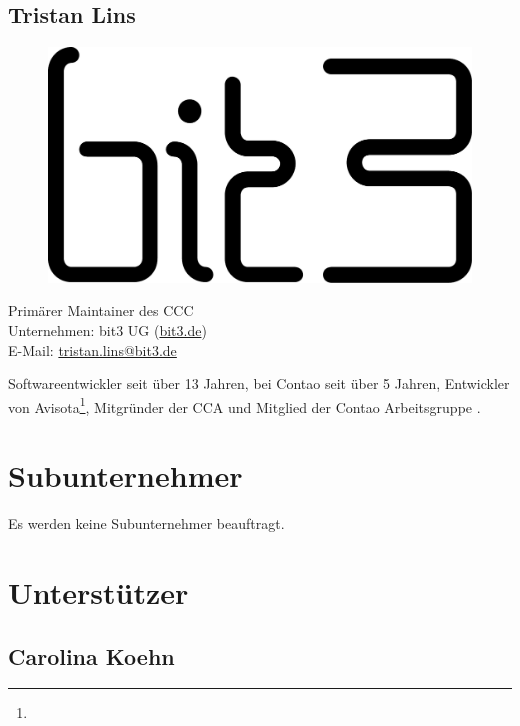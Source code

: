 \documentclass[
paper=a4,
draft=false,%
fontsize=10pt%
]{scrartcl}
\begin{document}
\subsection*{Tristan  Lins}

\begin{figure}
  \vspace{-40pt}
  \hfill
  \includegraphics[width=.2\textwidth]{bilder/bit3}
\end{figure}

Primärer Maintainer des CCC \\
Unternehmen: bit3 UG (\href{https://bit3.de}{bit3.de}) \\
E-Mail: \href{mailto:tristan.lins@bit3.de}{tristan.lins@bit3.de}

Softwareentwickler seit über 13 Jahren, bei Contao seit über 5 Jahren, Entwickler von Avisota\footnote{}, Mitgründer der CCA und Mitglied der Contao Arbeitsgruppe .

%
%

\section{Subunternehmer}
\label{sec:contractor}

Es werden keine Subunternehmer beauftragt.

\newpage

%
%

\section{Unterstützer}
\label{sec:backers}

\subsection*{Carolina  Koehn}
\end{document}
